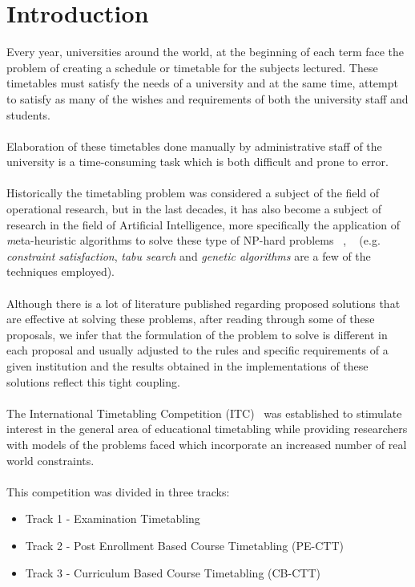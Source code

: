 \chapter{Introduction}
\label{introduction}
\thispagestyle{plain}

Every year, universities around the world, at the beginning of each term face the problem of creating a schedule or timetable for the subjects lectured. These timetables must satisfy the needs of a university and at the same time, attempt to satisfy as many of the wishes and requirements of both the university staff and students. \\
\\
Elaboration of these timetables done manually by administrative staff of the university is a time-consuming task which is both difficult and prone to error. \\
\\
Historically the timetabling problem was considered a subject of the field of operational research, but in the last decades, it has also become a subject of research in the field of Artificial Intelligence, more specifically the application of \emph meta-heuristic algorithms to solve these type of NP-hard problems ~\cite{Cooper1996}, ~\cite{Even1976} (e.g. \emph{constraint satisfaction}, \emph{tabu search} and \emph{genetic algorithms} are a few of the techniques employed). \\
\\
Although there is a lot of literature published regarding proposed solutions that are effective at solving these problems, after reading through some of these proposals, we infer that the formulation of the problem to solve is different in each proposal and usually adjusted to the rules and specific requirements of a given institution and the results obtained in the implementations of these solutions reflect this tight coupling. \\
\\
The International Timetabling Competition (ITC)~\cite{McCollum} was established to stimulate interest in the general area of educational timetabling while providing researchers with models of the problems faced which incorporate an increased number of real world constraints.\\
\\
This competition was divided in three tracks:\\
\begin{itemize}
\item Track 1 - Examination Timetabling
\item Track 2 - Post Enrollment Based Course Timetabling (PE-CTT)
\item Track 3 - Curriculum Based Course Timetabling (CB-CTT)
\end{itemize}
